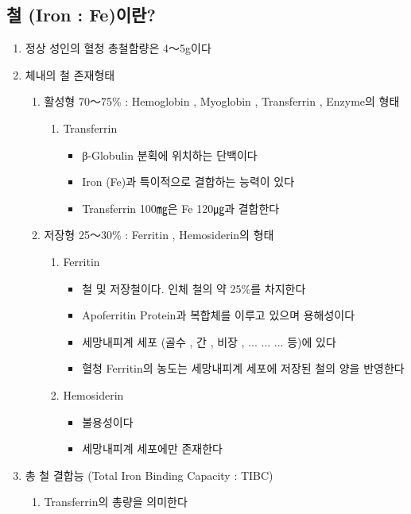 \subsection{철 (Iron : Fe)이란?} 
\begin{enumerate}[1)]\tightlist
\item 정상 성인의 혈청 총철함량은 4～5g이다 
\item 체내의 철 존재형태
	\begin{enumerate}[⑴]\tightlist
	\item 활성형 70～75\% : Hemoglobin , Myoglobin , Transferrin , Enzyme의 형태 
		\begin{enumerate}[①]\tightlist
		\item Transferrin 
			\begin{itemize}\tightlist
			\item β-Globulin 분획에 위치하는 단백이다 
			\item Iron (Fe)과 특이적으로 결합하는 능력이 있다 
			\item Transferrin 100㎎은 Fe 120㎍과 결합한다 
			\end{itemize}
		\end{enumerate}
	\item 저장형 25～30\% : Ferritin , Hemosiderin의 형태 
		\begin{enumerate}[①]\tightlist
		\item Ferritin 
			\begin{itemize}\tightlist
			\item 철 및 저장철이다. 인체 철의 약 25\%를 차지한다 
			\item Apoferritin Protein과 복합체를 이루고 있으며 용해성이다 
			\item 세망내피계 세포 (골수 , 간 , 비장 , ... ... ... 등)에 있다 
			\item 혈청 Ferritin의 농도는 세망내피계 세포에 저장된 철의 양을 반영한다 
			\end{itemize}
		\item Hemosiderin 
			\begin{itemize}\tightlist
			\item 불용성이다 
			\item 세망내피계 세포에만 존재한다 
			\end{itemize}
		\end{enumerate}
	\end{enumerate}
\item 총 철 결합능 (Total Iron Binding Capacity : TIBC)
	\begin{enumerate}[1)]\tightlist
	\item Transferrin의 총량을 의미한다 

\end{enumerate}
\end{enumerate}
